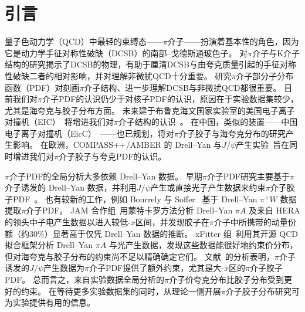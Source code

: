 \section{引言}

量子色动力学（QCD）中最轻的束缚态——$\pi$介子——扮演着基本性的角色，因为它是动力学手征对称性破缺（DCSB）的南部–戈德斯通玻色子。
对$\pi$介子与K介子结构的研究揭示了DCSB的物理，有助于厘清DCSB与由夸克质量引起的手征对称性破缺二者的相对影响，并对理解非微扰QCD十分重要。
研究$\pi$介子部分子分布函数（PDF）对刻画$\pi$介子结构、进一步理解DCSB与非微扰QCD都很重要。
目前我们对$\pi$介子PDF的认识仍少于对核子PDF的认识，原因在于实验数据集较少，尤其是海夸克与胶子分布方面。
未来建于布鲁克海文国家实验室的美国电子离子对撞机（EIC）~\cite{Accardi:2012qut}将增进我们对$\pi$介子结构的认识~\cite{Arrington:2021biu,Aguilar:2019teb}。
%
在中国，类似的装置——中国电子离子对撞机（EicC）~\cite{Anderle:2021wcy}——也已规划，将对$\pi$介子胶子与海夸克分布的研究产生影响。
%
在欧洲，COMPASS++/AMBER 的 Drell--Yan 与$J/\psi$产生实验~\cite{Denisov:2018unj}旨在同时增进我们对$\pi$介子胶子与夸克PDF的认识。

$\pi$介子PDF的全局分析大多依赖 Drell--Yan 数据。
早期$\pi$介子PDF研究主要基于$\pi$介子诱发的 Drell--Yan 数据，并利用$J/\psi$产生或直接光子产生数据来约束$\pi$介子胶子PDF~\cite{Owens:1984zj,Aurenche:1989sx,Sutton:1991ay,Gluck:1991ey,Gluck:1999xe}。
也有较新的工作，例如 Bourrely 与 Soffer~\cite{Bourrely:2018yck} 基于 Drell--Yan $\pi^+W$ 数据提取$\pi$介子PDF。
JAM 合作组~\cite{Barry:2018ort,Cao:2021aci}用蒙特卡罗方法分析 Drell--Yan $\pi A$ 及来自 HERA 的领头中子电产生数据以进入较低-$x$区间，并发现胶子在$\pi$介子中所携带的动量份额（约$30\%$）显著高于仅凭 Drell--Yan 数据的推断。
xFitter 组~\cite{Novikov:2020snp}利用其开源 QCD 拟合框架分析 Drell--Yan $\pi A$ 与光产生数据，发现这些数据能很好地约束价分布，但对海夸克与胶子分布的约束尚不足以精确确定它们。
文献~\cite{Chang:2020rdy}的分析表明，$\pi$介子诱发的$J/\psi$产生数据为$\pi$介子PDF提供了额外约束，尤其是大-$x$区的$\pi$介子胶子PDF。
总而言之，来自实验数据全局分析的$\pi$介子价夸克分布比胶子分布受到更好的约束。
在等待更多实验数据集的同时，从理论一侧开展$\pi$介子胶子分布研究可为实验提供有用的信息。

